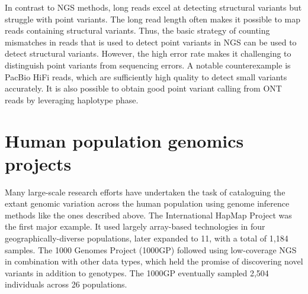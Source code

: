 \documentclass[11pt]{ucthesis}
\begin{document}

In contrast to NGS methods, long reads excel at detecting structural variants but struggle with point variants. The long read length often makes it possible to map reads containing structural variants. Thus, the basic strategy of counting mismatches in reads that is used to detect point variants in NGS can be used to detect structural variants\cite{sedlazeck2018accurate,huddleston2017discovery}. However, the high error rate makes it challenging to distinguish point variants from sequencing errors. A notable counterexample is PacBio HiFi reads, which are sufficiently high quality to detect small variants accurately\cite{wenger2019accurate}. It is also possible to obtain good point variant calling from ONT reads by leveraging haplotype phase\cite{shafin2021haplotype}.


\section{Human population genomics projects}

Many large-scale research efforts have undertaken the task of cataloguing the extant genomic variation across the human population using genome inference methods like the ones described above. The International HapMap Project was the first major example. It used largely array-based technologies in four geographically-diverse populations\cite{international2005haplotype,international2007second}, later expanded to 11\cite{international2010integrating}, with a total of 1,184 samples. The 1000 Genomes Project (1000GP) followed using low-coverage NGS in combination with other data types, which held the promise of discovering novel variants in addition to genotypes\cite{10002010map,10002012integrated}. The 1000GP eventually sampled 2,504 individuals across 26 populations\cite{10002015global}.
\end{document}
